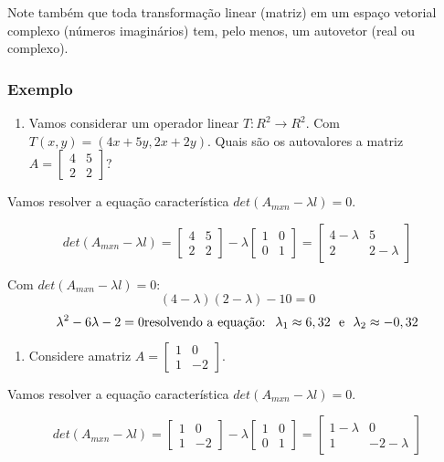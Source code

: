\documentclass[
  openany]{book}
\providecommand{\tightlist}{%
  \setlength{\itemsep}{0pt}\setlength{\parskip}{0pt}}
\begin{document}
Note também que toda transformação linear (matriz) em um espaço
vetorial complexo (números imaginários) tem, pelo menos, um autovetor (real ou complexo).

\hypertarget{exautovetor1}{%
\subsubsection{Exemplo}\label{exautovetor1}}

\begin{enumerate}
\def\labelenumi{\arabic{enumi}.}
\tightlist
\item
  Vamos considerar um operador linear \textbf{\(T: R^2 \rightarrow R^2\)}. Com \(T(x,y)=(4x+5y,2x+2y)\). Quais são os autovalores a matriz \(A=\begin{bmatrix} 4 &5 \\ 2 &2 \end{bmatrix}\)?
\end{enumerate}

Vamos resolver a equação característica \(det(A_{mxn}-\lambda l)=0\).

\[det(A_{mxn}-\lambda l)=\begin{bmatrix}
4 &5 \\ 
2 &2 
\end{bmatrix} - \lambda \begin{bmatrix}
1 &0 \\ 
0 &1 
\end{bmatrix} = \begin{bmatrix}
4-\lambda &5 \\ 
2 &2-\lambda 
\end{bmatrix}\]

Com \(det(A_{mxn}-\lambda l)=0:\)
\[(4-\lambda)(2-\lambda)-10=0 \]
\[\lambda^2-6\lambda-2=0 \\ \mbox{resolvendo a equação: } \ 
\lambda_1 \approx 6,32 \  \ \mbox{e} \ \ \lambda_2 \approx -0,32\]

\begin{enumerate}
\def\labelenumi{\arabic{enumi}.}
\setcounter{enumi}{1}
\tightlist
\item
  Considere amatriz \(A=\begin{bmatrix} 1 &0 \\ 1 &-2 \end{bmatrix}\).
\end{enumerate}

Vamos resolver a equação característica \(det(A_{mxn}-\lambda l)=0\).

\[det(A_{mxn}-\lambda l)=\begin{bmatrix}
1 &0 \\ 
1 &-2 
\end{bmatrix} - \lambda \begin{bmatrix}
1 &0 \\ 
0 &1 
\end{bmatrix} = \begin{bmatrix}
1-\lambda &0 \\ 
1 &-2-\lambda 
\end{bmatrix}\]
\end{document}
